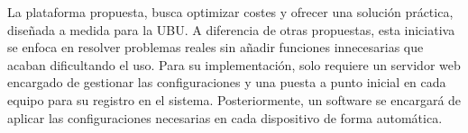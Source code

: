La plataforma propuesta, busca optimizar costes y ofrecer una solución práctica, diseñada a medida para la UBU.
A diferencia de otras propuestas, esta iniciativa se enfoca en resolver problemas reales sin añadir funciones innecesarias
que acaban dificultando el uso.
Para su implementación, solo requiere un servidor web encargado de gestionar las configuraciones y una puesta a punto inicial
en cada equipo para su registro en el sistema.
Posteriormente, un software se encargará de aplicar las configuraciones
necesarias en cada dispositivo de forma automática.
